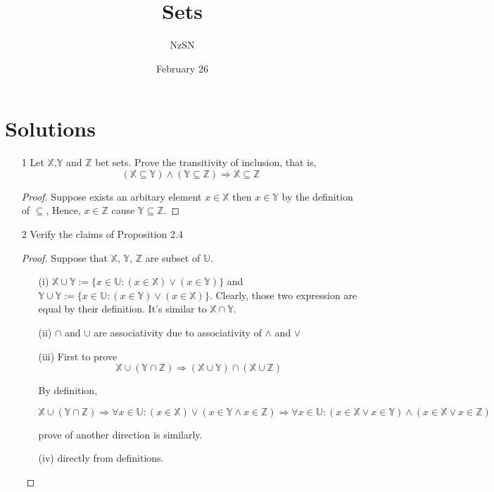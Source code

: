 \documentclass[11pt]{book}
\title{Sets}
\author{NzSN}
\date{February 26}
\newcommand{\bb}[1]{\mathbb{#1}}
\newcommand{\Ra}{\Rightarrow}
\begin{document}
\maketitle

\vspace{0.2 cm}
\section{Solutions}

\begin{enumerate}
\item[1]
        Let $\bb{X}$,$\bb{Y}$ and $\bb{Z}$ bet sets.
        Prove the transitivity of inclusion, that is,
        $$(\bb{X} \subseteq \bb{Y}) \land (\bb{Y} \subseteq \bb{Z}) \Ra \bb{X} \subseteq \bb{Z}$$
\begin{proof}
  Suppose exists an arbitary element $x \in \bb{X}$ then $x \in \bb{Y}$ by the definition of $\subseteq$,
  Hence, $x \in \bb{Z}$ cause $\bb{Y} \subseteq \bb{Z}$.
\end{proof}

\item[2]
        Verify the claims of Proposition 2.4
\begin{proof}
Suppose that $\bb{X}$, $\bb{Y}$, $\bb{Z}$ are subset of $\bb{U}$.
\begin{enumerate}
  \item[(i)]
        $\bb{X} \cup \bb{Y} := \{ x \in \bb{U} : (x \in \bb{X}) \lor (x \in \bb{Y}) \}$ and
        $\bb{Y} \cup \bb{Y} := \{ x \in \bb{U} : (x \in \bb{Y}) \lor (x \in \bb{X}) \}$.
        Clearly, those two expression are equal by their definition. It's similar to $\bb{X} \cap \bb{Y}$.
  \item[(ii)]
        $\cap$ and $\cup$ are associativity due to associativity of $\land$ and $\lor$
  \item[(iii)]
        First to prove
        $$\bb{X} \cup (\bb{Y} \cap \bb{Z}) \Ra
        (\bb{X} \cup \bb{Y}) \cap (\bb{X} \cup \bb{Z})$$

        By definition,

        $$\bb{X} \cup (\bb{Y} \cap \bb{Z}) \Ra
        \forall x \in \bb{U}: (x \in \bb{X}) \lor (x \in \bb{Y} \land x \in \bb{Z})
        \Ra \forall x \in \bb{U}: (x \in \bb{X} \lor x \in \bb{Y}) \land (x \in \bb{X} \lor x \in \bb{Z})$$

        prove of another direction is similarly.
  \item[(iv)]
        directly from definitions.
\end{enumerate}

\end{proof}

\end{enumerate}
\end{document}
